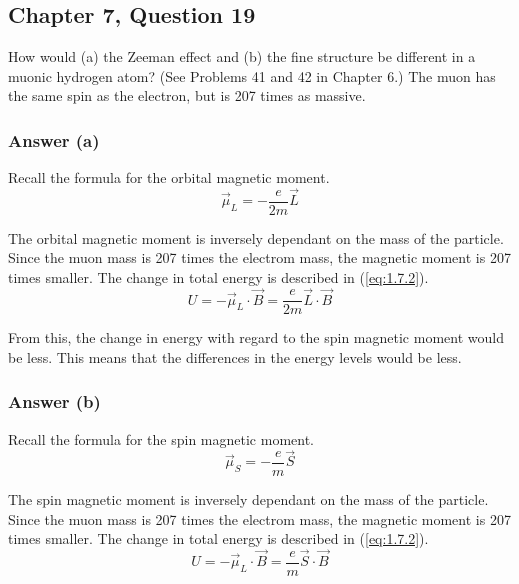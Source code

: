 \documentclass[12pt]{article}
\begin{document}
        \subsection{Chapter 7, Question 19}
            How would (a) the Zeeman effect and (b) the fine structure be different in a muonic hydrogen atom? 
            (See Problems 41 and 42 in Chapter 6.) 
            The muon has the same spin as the electron, but is 207 times as massive.

            \subsubsection{Answer (a)}
                Recall the formula for the orbital magnetic moment.
                \begin{equation}
                    \label{eq:1.7.1}
                    \vec{\mu}_L = -\frac{e}{2m}\vec{L}
                \end{equation}

                The orbital magnetic moment is inversely dependant on the mass of the particle.
                Since the muon mass is 207 times the electrom mass, the magnetic moment is 207 times smaller.
                The change in total energy is described in (\ref{eq:1.7.2}).
                \begin{equation}
                    \label{eq:1.7.2}
                    U = -\vec{\mu}_L \cdot \vec{B} = \frac{e}{2m} \vec{L} \cdot \vec{B}
                \end{equation}

                From this, the change in energy with regard to the spin magnetic moment would be less.
                This means that the differences in the energy levels would be less.

            \subsubsection{Answer (b)}
                Recall the formula for the spin magnetic moment.
                \begin{equation}
                    \label{eq:1.7.3}
                    \vec{\mu}_S = -\frac{e}{m}\vec{S}
                \end{equation}

                The spin magnetic moment is inversely dependant on the mass of the particle.
                Since the muon mass is 207 times the electrom mass, the magnetic moment is 207 times smaller.
                The change in total energy is described in (\ref{eq:1.7.2}).
                \begin{equation}
                    \label{eq:1.7.4}
                    U = -\vec{\mu}_L \cdot \vec{B} = \frac{e}{m} \vec{S} \cdot \vec{B}
                \end{equation}
\end{document}
